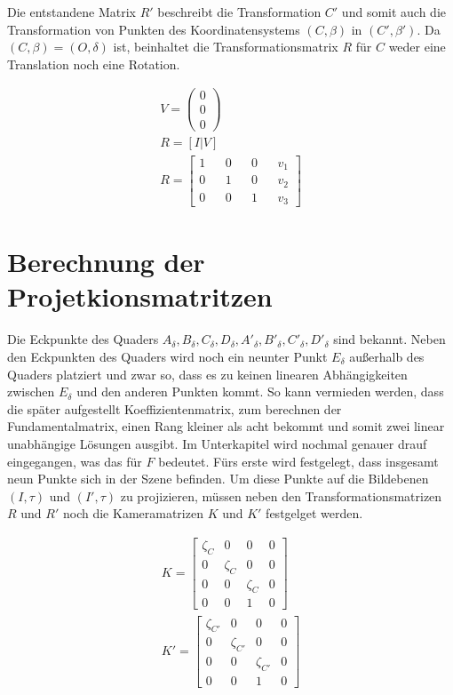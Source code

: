 Die entstandene Matrix \ensuremath{R'} beschreibt die Transformation $C'$ und somit auch die Transformation von Punkten des Koordinatensystems $(C,\beta)$ in $(C',\beta')$. Da $(C,\beta) = (O,\delta)$ ist, beinhaltet die Transformationsmatrix $R$ für $C$ weder eine Translation noch eine Rotation.

\begin{gather}
V=\begin{pmatrix}
0\\0\\0
\end{pmatrix}\\
	R = [I|V]\\
	R = \begin{bmatrix}
	1&&0&&0&&v_1\\
	0&&1&&0&&v_2\\
	0&&0&&1&&v_3
	\end{bmatrix}
\end{gather} 


\section{Berechnung der Projetkionsmatritzen }

Die Eckpunkte des Quaders $A_\delta,B_\delta,C_\delta,D_\delta,A'_\delta,B'_\delta,C'_\delta,D'_\delta$ sind bekannt. Neben den Eckpunkten des Quaders wird noch ein neunter Punkt $E_\delta$ außerhalb des Quaders platziert und zwar so, dass es zu keinen linearen Abhängigkeiten zwischen $E_\delta$ und den anderen Punkten kommt. So kann vermieden werden, dass die später aufgestellt Koeffizientenmatrix, zum berechnen der Fundamentalmatrix, einen Rang kleiner als acht bekommt und somit zwei linear unabhängige Lösungen ausgibt\cite{HZ}. Im Unterkapitel  wird nochmal genauer drauf eingegangen, was das für $F$ bedeutet. Fürs erste wird festgelegt, dass insgesamt neun Punkte sich in der Szene befinden. Um diese Punkte auf die Bildebenen $(I,\tau)$ und $(I',\tau)$ zu projizieren, müssen neben den Transformationsmatrizen $R$ und $R'$ noch die Kameramatrizen $K$ und $K'$ festgelget werden. 


\begin{gather}		
K =
\begin{bmatrix}
\zeta_{C}&0&0&0\\
0&\zeta_{C}&0&0\\
0&0&\zeta_{C}&0\\
0&0&1&0
\end{bmatrix}\\
K' =
\begin{bmatrix}
\zeta_{C'}&0&0&0\\
0&\zeta_{C'}&0&0\\
0&0&\zeta_{C'}&0\\
0&0&1&0
\end{bmatrix}
\end{gather}

